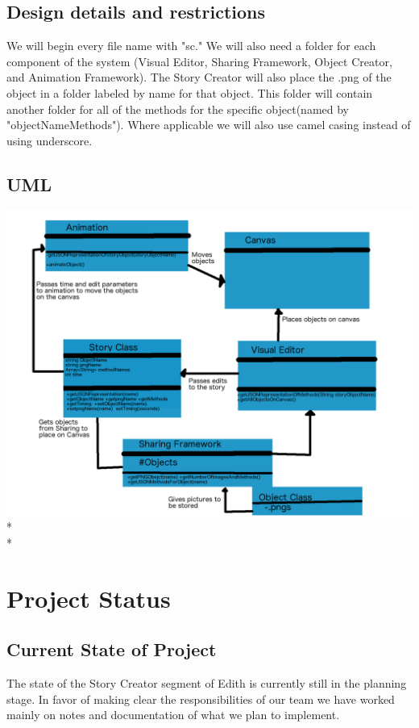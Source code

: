 \documentclass[12pt]{article}
\begin{document}
\subsection{Design details and restrictions}
We will begin every file name with "sc."  We will also need a folder for each component of the system (Visual Editor, Sharing Framework, Object Creator, and Animation Framework).  The Story Creator will also place the .png of the object in a folder labeled by name for that object.  This folder will contain another folder for all of the methods for the specific object(named by "objectNameMethods").  Where applicable we will also use camel casing instead of using underscore. 

\newpage
\subsection{UML}
\includegraphics[scale=0.26]{Story_Creator_UML}
\\*
\\*

\section{Project Status} 
\subsection{Current State of Project}
The state of the Story Creator segment of Edith is currently still in the planning stage. In favor of making clear the responsibilities of our team we have worked mainly on notes and documentation of what we plan to implement.
\end{document}
